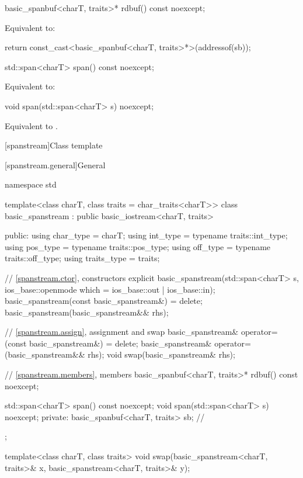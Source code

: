 %
\begin{itemdecl}
basic_spanbuf<charT, traits>* rdbuf() const noexcept;
\end{itemdecl}

\begin{itemdescr}
\pnum
\effects
Equivalent to:
\begin{codeblock}
return const_cast<basic_spanbuf<charT, traits>*>(addressof(sb));
\end{codeblock}
\end{itemdescr}

%
\begin{itemdecl}
std::span<charT> span() const noexcept;
\end{itemdecl}

\begin{itemdescr}
\pnum
\effects
Equivalent to: 
\end{itemdescr}

%
\begin{itemdecl}
void span(std::span<charT> s) noexcept;
\end{itemdecl}

\begin{itemdescr}
\pnum
\effects
Equivalent to .
\end{itemdescr}

[spanstream]{Class template }

[spanstream.general]{General}

%
\begin{codeblock}
namespace std {
  template<class charT, class traits = char_traits<charT>>
  class basic_spanstream
    : public basic_iostream<charT, traits> {
  public:
    using char_type   = charT;
    using int_type    = typename traits::int_type;
    using pos_type    = typename traits::pos_type;
    using off_type    = typename traits::off_type;
    using traits_type = traits;

    // \ref{spanstream.ctor}, constructors
    explicit basic_spanstream(std::span<charT> s,
                              ios_base::openmode which = ios_base::out | ios_base::in);
    basic_spanstream(const basic_spanstream&) = delete;
    basic_spanstream(basic_spanstream&& rhs);

    // \ref{spanstream.assign}, assignment and swap
    basic_spanstream& operator=(const basic_spanstream&) = delete;
    basic_spanstream& operator=(basic_spanstream&& rhs);
    void swap(basic_spanstream& rhs);

    // \ref{spanstream.members}, members
    basic_spanbuf<charT, traits>* rdbuf() const noexcept;

    std::span<charT> span() const noexcept;
    void span(std::span<charT> s) noexcept;
  private:
    basic_spanbuf<charT, traits> sb;    // \expos
  };

  template<class charT, class traits>
    void swap(basic_spanstream<charT, traits>& x, basic_spanstream<charT, traits>& y);
}
\end{codeblock}

